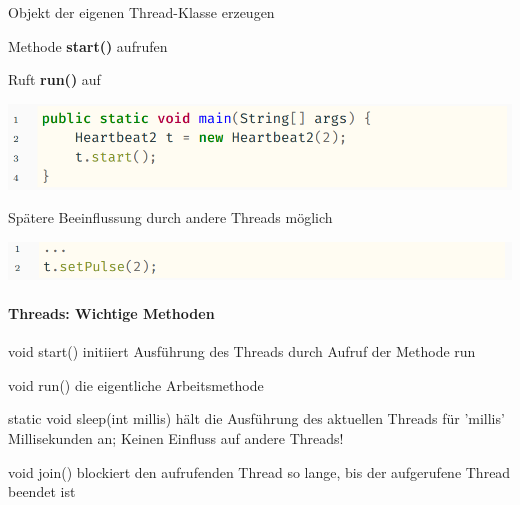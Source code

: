 \documentclass[10pt]{article}
\begin{document}
  \begin{itemize*}
    \item Objekt der eigenen Thread-Klasse erzeugen
    \item Methode \textbf{start()} aufrufen
    \begin{itemize*}
      \item Ruft \textbf{run()} auf
    \end{itemize*}
    \begin{center}
      \centering
      \includegraphics[width=0.4\linewidth]{Assets/Programmierparadigmen-code-snippet-50}
    \end{center}
    \item Spätere Beeinflussung durch andere Threads möglich
    \begin{center}
      \centering
      \includegraphics[width=0.4\linewidth]{Assets/Programmierparadigmen-code-snippet-51}
    \end{center}
  \end{itemize*}
  
  
  \paragraph{Threads: Wichtige Methoden}
  
  \begin{description*}
    \item[void start()] initiiert Ausführung des Threads durch Aufruf der Methode run
    \item[void run()] die eigentliche Arbeitsmethode
    \item[static void sleep(int millis)] hält die Ausführung des aktuellen Threads für 'millis' Millisekunden an; Keinen Einfluss auf andere Threads!
    \item[void join()] blockiert den aufrufenden Thread so lange, bis der aufgerufene Thread beendet ist
  \end{description*}
  
\end{document}
